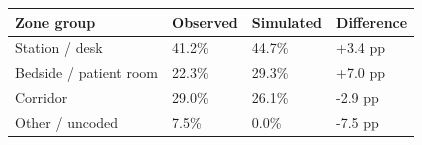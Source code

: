 \begin{tabular}{llll}
\toprule
\textbf{Zone group} & \textbf{Observed} & \textbf{Simulated} & \textbf{Difference} \\
\midrule
Station / desk & 41.2\% & 44.7\% & +3.4 pp \\
Bedside / patient room & 22.3\% & 29.3\% & +7.0 pp \\
Corridor & 29.0\% & 26.1\% & -2.9 pp \\
Other / uncoded & 7.5\% & 0.0\% & -7.5 pp \\
\bottomrule
\end{tabular}
